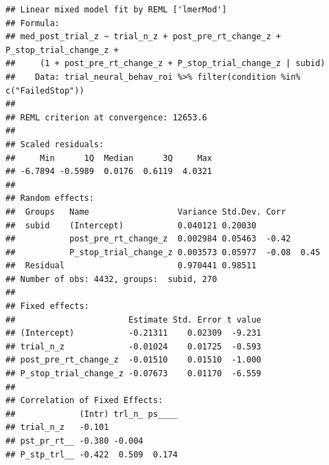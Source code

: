 \documentclass[
]{article}
\newenvironment{Shaded}{\begin{snugshade}}{\end{snugshade}}
\newcommand{\DecValTok}[1]{\textcolor[rgb]{0.00,0.00,0.81}{#1}}
\newcommand{\KeywordTok}[1]{\textcolor[rgb]{0.13,0.29,0.53}{\textbf{#1}}}
\newcommand{\NormalTok}[1]{#1}
\newcommand{\OperatorTok}[1]{\textcolor[rgb]{0.81,0.36,0.00}{\textbf{#1}}}
\newcommand{\StringTok}[1]{\textcolor[rgb]{0.31,0.60,0.02}{#1}}
\begin{document}
\begin{Shaded}
\end{Shaded}

\begin{verbatim}
## Linear mixed model fit by REML ['lmerMod']
## Formula: 
## med_post_trial_z ~ trial_n_z + post_pre_rt_change_z + P_stop_trial_change_z +  
##     (1 + post_pre_rt_change_z + P_stop_trial_change_z | subid)
##    Data: trial_neural_behav_roi %>% filter(condition %in% c("FailedStop"))
## 
## REML criterion at convergence: 12653.6
## 
## Scaled residuals: 
##     Min      1Q  Median      3Q     Max 
## -6.7894 -0.5989  0.0176  0.6119  4.0321 
## 
## Random effects:
##  Groups   Name                  Variance Std.Dev. Corr       
##  subid    (Intercept)           0.040121 0.20030             
##           post_pre_rt_change_z  0.002984 0.05463  -0.42      
##           P_stop_trial_change_z 0.003573 0.05977  -0.08  0.45
##  Residual                       0.970441 0.98511             
## Number of obs: 4432, groups:  subid, 270
## 
## Fixed effects:
##                       Estimate Std. Error t value
## (Intercept)           -0.21311    0.02309  -9.231
## trial_n_z             -0.01024    0.01725  -0.593
## post_pre_rt_change_z  -0.01510    0.01510  -1.000
## P_stop_trial_change_z -0.07673    0.01170  -6.559
## 
## Correlation of Fixed Effects:
##             (Intr) trl_n_ ps____
## trial_n_z   -0.101              
## pst_pr_rt__ -0.380 -0.004       
## P_stp_trl__ -0.422  0.509  0.174
\end{verbatim}
\end{document}
